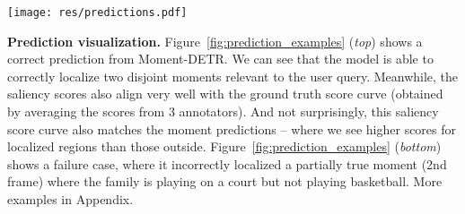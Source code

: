 \begin{table}[t!]
\setlength{\tabcolsep}{0.8em}
\small
\centering
\caption{Results on CharadesSTA~\cite{gao2017tall} \textit{test} split.
}
\label{tab:charades_sta_results}
\vspace{-5pt}
\end{table}



\begin{figure*}[!t]
  \centering
  \texttt{[image: res/predictions.pdf]}
  \caption{Prediction visualization. Predictions are shown in \textcolor{red}{solid red boxes or lines}, ground-truth are indicated by \textcolor{ForestGreen}{dashed green lines}. \textit{Top} row shows a correct prediction, \textit{bottom} row shows a failure.}
  \label{fig:prediction_examples}
  \vspace{-5pt}
\end{figure*}



\textbf{Prediction visualization.} 
Figure~\ref{fig:prediction_examples} (\textit{top}) shows a correct prediction from Moment-DETR. 
We can see that the model is able to correctly localize two disjoint moments relevant to the user query. 
Meanwhile, the saliency scores also align very well with the ground truth score curve (obtained by averaging the scores from 3 annotators).
And not surprisingly, this saliency score curve also matches the moment predictions -- where we see higher scores for localized regions than those outside.
Figure~\ref{fig:prediction_examples} (\textit{bottom}) shows a failure case, where it incorrectly localized a partially true moment (2nd frame) where the family is playing on a court but not playing basketball. 
More examples in Appendix. 


